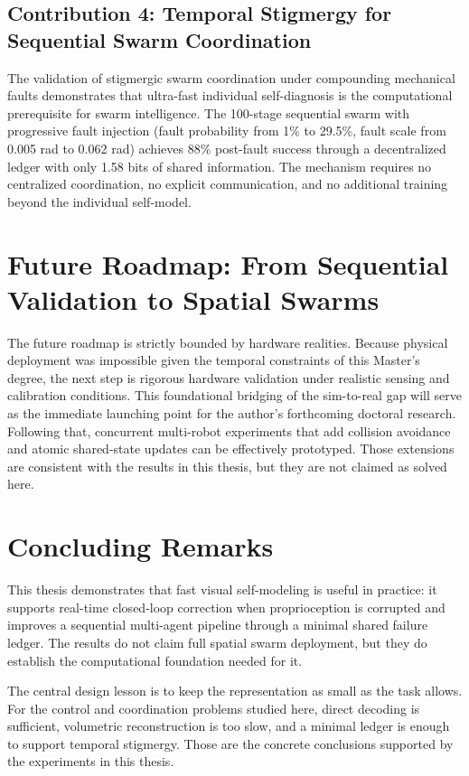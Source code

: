 \documentclass[12pt,a4paper,oneside]{report}
\begin{document}
\subsection{Contribution 4: Temporal Stigmergy for Sequential Swarm Coordination}

The validation of stigmergic swarm coordination under compounding mechanical faults demonstrates that ultra-fast individual self-diagnosis is the computational prerequisite for swarm intelligence. The 100-stage sequential swarm with progressive fault injection (fault probability from 1\% to 29.5\%, fault scale from 0.005 rad to 0.062 rad) achieves 88\% post-fault success through a decentralized ledger with only 1.58 bits of shared information. The mechanism requires no centralized coordination, no explicit communication, and no additional training beyond the individual self-model.

\section{Future Roadmap: From Sequential Validation to Spatial Swarms}

The future roadmap is strictly bounded by hardware realities. Because physical deployment was impossible given the temporal constraints of this Master's degree, the next step is rigorous hardware validation under realistic sensing and calibration conditions. This foundational bridging of the sim-to-real gap will serve as the immediate launching point for the author's forthcoming doctoral research. Following that, concurrent multi-robot experiments that add collision avoidance and atomic shared-state updates can be effectively prototyped. Those extensions are consistent with the results in this thesis, but they are not claimed as solved here.

\section{Concluding Remarks}

This thesis demonstrates that fast visual self-modeling is useful in practice: it supports real-time closed-loop correction when proprioception is corrupted and improves a sequential multi-agent pipeline through a minimal shared failure ledger. The results do not claim full spatial swarm deployment, but they do establish the computational foundation needed for it.

The central design lesson is to keep the representation as small as the task allows. For the control and coordination problems studied here, direct decoding is sufficient, volumetric reconstruction is too slow, and a minimal ledger is enough to support temporal stigmergy. Those are the concrete conclusions supported by the experiments in this thesis.
\end{document}
